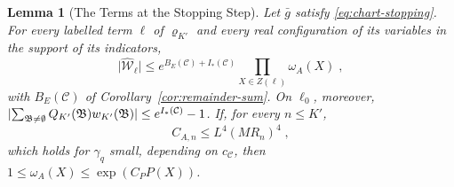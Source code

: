 \documentclass[11pt]{preprint}
\DeclarePairedDelimiter{\abs}{\lvert}{\rvert}
\numberwithin{equation}{section}
\newtheorem{lemma}[theorem]{Lemma}
\theoremstyle{definition}
\theoremstyle{remark}
\theoremstyle{plain}
\begin{document}
\begin{lemma}[The Terms at the Stopping Step]\label{lem:term-bound}
Let $\bar g$ satisfy \eqref{eq:chart-stopping}. For every labelled term $\ell$ of $\varrho_{K'}$ and every real configuration of its variables in the support of its indicators,
\begin{equation}\label{eq:term-bound}
    \bigl\lvert\widehat{\mathcal W}_\ell\bigr\rvert \leq e^{B_E(\mathcal C) + I_*(\mathcal C)}\prod_{X \in Z(\ell)}\omega_A(X)\;,
\end{equation}
with $B_E(\mathcal C)$ of Corollary~\ref{cor:remainder-sum}. On $\ell_0$, moreover, $\abs{\sum_{\mathfrak B \neq \emptyset}Q_{K'}(\mathfrak B)w_{K'}(\mathfrak B)} \leq e^{I_*(\mathcal C)} - 1$. If, for every $n \leq K'$,
\begin{equation}\label{eq:attached-condition}
    C_{A,n} \leq L^4(MR_n)^4\;,
\end{equation}
which holds for $\gamma_q$ small, depending on $c_{\mathcal C}$, then $1 \leq \omega_A(X) \leq \exp(C_PP(X))$.
\end{lemma}
\end{document}

